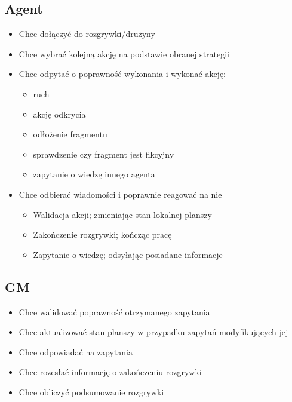 \documentclass[Dokumentacja.tex]{subfiles}
\begin{document}
\subsection{Agent}
\begin{itemize}
    \item Chce dołączyć do rozgrywki/drużyny
    \item Chce wybrać kolejną akcję na podstawie obranej strategii
    \item Chce odpytać o poprawność wykonania i wykonać akcję:
    \begin{itemize}
        \item ruch
        \item akcję odkrycia
        \item odłożenie fragmentu
        \item sprawdzenie czy fragment jest fikcyjny
        \item zapytanie o wiedzę innego agenta
    \end{itemize}
    \item Chce odbierać wiadomości i poprawnie reagować na nie
    \begin{itemize}
        \item Walidacja akcji; zmieniając stan lokalnej planszy
        \item Zakończenie rozgrywki; kończąc pracę
        \item Zapytanie o wiedzę; odsyłając posiadane informacje
    \end{itemize}
\end{itemize}

\subsection{GM}
\begin{itemize}
    \item Chce walidować poprawność otrzymanego zapytania
    \item Chce aktualizować stan planszy w przypadku zapytań modyfikujących jej
    \item Chce odpowiadać na zapytania
    \item Chce rozesłać informację o zakończeniu rozgrywki
    \item Chce obliczyć podsumowanie rozgrywki
\end{itemize}
\end{document}
